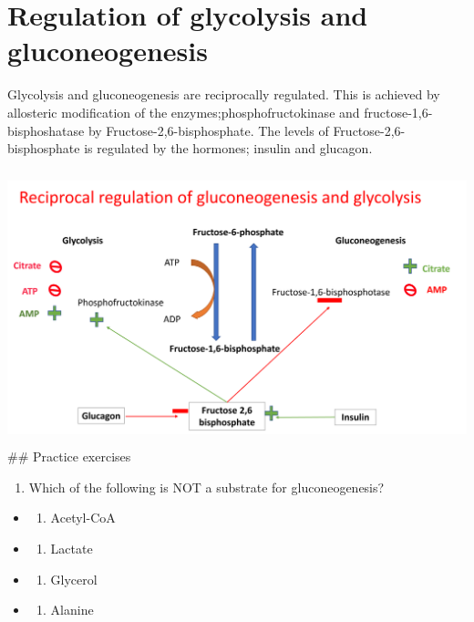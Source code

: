 \documentclass[
]{book}
\providecommand{\tightlist}{%
  \setlength{\itemsep}{0pt}\setlength{\parskip}{0pt}}
\begin{document}
\section{Regulation of glycolysis and gluconeogenesis}\label{regulation-of-glycolysis-and-gluconeogenesis}

Glycolysis and gluconeogenesis are reciprocally regulated. This is achieved by allosteric modification of the enzymes;phosphofructokinase and fructose-1,6-bisphoshatase by Fructose-2,6-bisphosphate. The levels of Fructose-2,6-bisphosphate is regulated by the hormones; insulin and glucagon.

\includegraphics[width=\textwidth,height=3.125in]{Images/reg_gly_gluco.png}
\#\# Practice exercises

\begin{enumerate}
\def\labelenumi{\arabic{enumi}.}
\tightlist
\item
  Which of the following is NOT a substrate for gluconeogenesis?
\end{enumerate}

\begin{itemize}
\tightlist
\item
  \begin{enumerate}
  \def\labelenumi{(\Alph{enumi})}
  \tightlist
  \item
    Acetyl-CoA\\
  \end{enumerate}
\item
  \begin{enumerate}
  \def\labelenumi{(\Alph{enumi})}
  \setcounter{enumi}{1}
  \tightlist
  \item
    Lactate\\
  \end{enumerate}
\item
  \begin{enumerate}
  \def\labelenumi{(\Alph{enumi})}
  \setcounter{enumi}{2}
  \tightlist
  \item
    Glycerol\\
  \end{enumerate}
\item
  \begin{enumerate}
  \def\labelenumi{(\Alph{enumi})}
  \setcounter{enumi}{3}
  \tightlist
  \item
    Alanine
  \end{enumerate}
\end{itemize}
\end{document}
